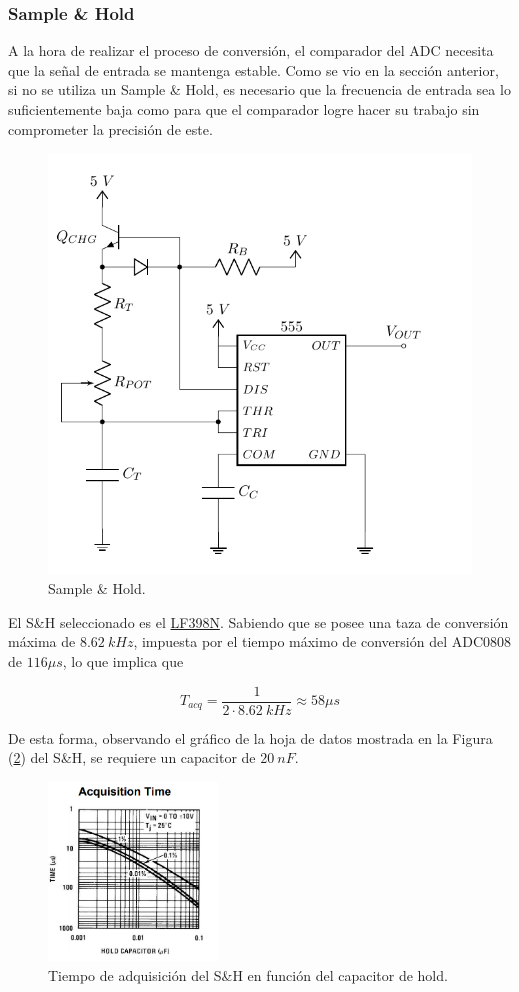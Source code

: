 \subsubsection{Sample \& Hold}

A la hora de realizar el proceso de conversión, el comparador del ADC necesita que la señal de entrada se mantenga estable. Como se vio en la sección anterior, si no se utiliza un Sample \& Hold, es necesario que la frecuencia de entrada sea lo suficientemente baja como para que el comparador logre hacer su trabajo sin comprometer la precisión de este.

\begin{figure}[H]
\centering
	\includegraphics[width=0.5\linewidth, page = 5]{ImagenesEjercicio1/Components.pdf}
	\caption{Sample \& Hold.}
	\label{fig:sandhold}
\end{figure}

El S\&H seleccionado es el \href{https://pdf1.alldatasheet.es/datasheet-pdf/view/8580/NSC/LF398N.html}{LF398N}. Sabiendo que se posee una taza de conversión máxima de $8.62 \ kHz$, impuesta por el tiempo máximo de conversión del ADC0808 de $116 \mu s$, lo que implica que

\begin{equation*}
	T_{acq} = \frac{1}{2\cdot 8.62 \ kHz} \approx 58 \mu s
\end{equation*}

De esta forma, observando el gráfico de la hoja de datos mostrada en la Figura (\ref{chacqtime}) del S\&H, se requiere un capacitor de $20 \ nF$.

\begin{figure}[H]
	\centering
	\includegraphics[width=0.4\textwidth]{ImagenesEjercicio1/chacqtime.png}
\caption{Tiempo de adquisición del S\&H en función del capacitor de hold.}
	\label{chacqtime}
\end{figure}

